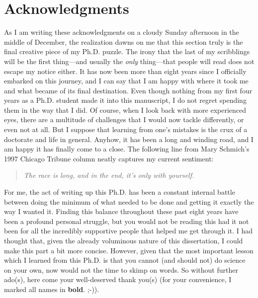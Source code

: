 \chapter*{Acknowledgments}
%
\label{ch:preface}
%

%
%

As I am writing these acknowledgments on a cloudy Sunday afternoon in the middle of December, the realization
dawns on me that this section truly is the final creative piece of my Ph.D. puzzle. The irony that the last of
my scribblings will be the first thing---and usually the \emph{only} thing---that people will read does not
escape my notice either. It has now been more than eight years since I officially embarked on this journey,
and I can say that I am happy with where it took me and what became of its final destination. Even though
nothing from my first four years as a Ph.D. student made it into this manuscript, I do not regret spending
them in the way that I did. Of course, when I look back with more experienced eyes, there are a multitude of
challenges that I would now tackle differently, or even not at all. But I suppose that learning from one's
mistakes is the crux of a doctorate and life in general. Anyhow, it has been a long and winding road, and I am
happy it has finally come to a close. The following line from Mary Schmich's 1997 Chicago Tribune column
neatly captures my current sentiment:
%
\begin{quote}
\textit{The race is long, and in the end, it's only with yourself.}
\end{quote}
%
For me, the act of writing up this Ph.D. has been a constant internal battle between doing the minimum of what
needed to be done and getting it exactly the way I wanted it. Finding this balance throughout these past eight
years have been a profound personal struggle, but you would not be reading this had it not been for all the
incredibly supportive people that helped me get through it. I had thought that, given the already voluminous
nature of this dissertation, I could make this part a bit more concise. However, given that the most important
lesson which I learned from this Ph.D. is that you cannot (and should not) do science on your own, now would
not the time to skimp on words. So without further ado(s), here come your well-deserved thank you(s) (for your
convenience, I marked all names in \textbf{bold}. ;-)).

